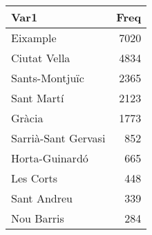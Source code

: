 
\begin{tabular}[t]{lr}
\toprule
Var1 & Freq\\
\midrule
Eixample & 7020\\
Ciutat Vella & 4834\\
Sants-Montjuïc & 2365\\
Sant Martí & 2123\\
Gràcia & 1773\\
\addlinespace
Sarrià-Sant Gervasi & 852\\
Horta-Guinardó & 665\\
Les Corts & 448\\
Sant Andreu & 339\\
Nou Barris & 284\\
\bottomrule
\end{tabular}